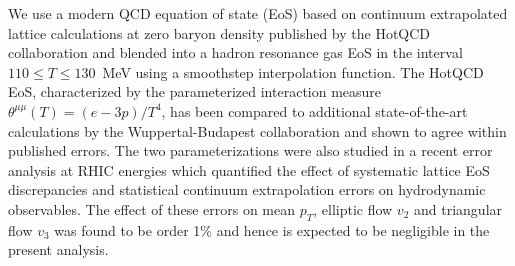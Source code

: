 \documentclass[aps,prc,reprint,amsmath,nofootinbib]{revtex4-1}
\begin{document}
We use a modern QCD equation of state (EoS) based on continuum extrapolated lattice calculations at zero baryon density published by the HotQCD collaboration and blended into a hadron resonance gas EoS in the interval $110 \le T \le 130$~MeV using a smoothstep interpolation function.
The HotQCD EoS, characterized by the parameterized interaction measure $\theta^{\mu\mu}(T) = (e - 3p)/T^4$, has been compared to additional state-of-the-art calculations by the Wuppertal-Budapest collaboration and shown to agree within published errors.
The two parameterizations were also studied in a recent error analysis at RHIC energies which quantified the effect of systematic lattice EoS discrepancies and statistical continuum extrapolation errors on hydrodynamic observables.
The effect of these errors on mean $p_T$, elliptic flow $v_2$ and triangular flow $v_3$ was found to be order 1\% and hence is expected to be negligible in the present analysis.
\end{document}
